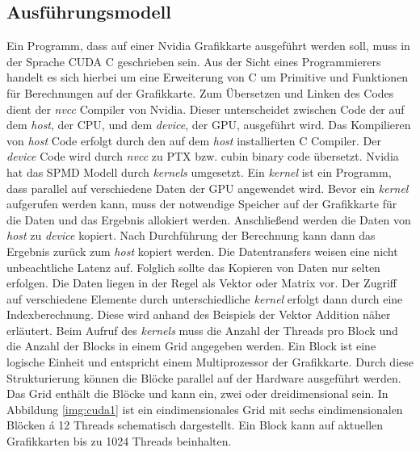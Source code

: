 \subsection{Ausführungsmodell}

Ein Programm, dass auf einer Nvidia Grafikkarte ausgeführt werden soll, muss in der Sprache CUDA C geschrieben sein. Aus der Sicht eines Programmierers handelt es sich hierbei um eine Erweiterung von C um Primitive und Funktionen für Berechnungen auf der Grafikkarte. Zum Übersetzen und Linken des Codes dient der \textit{nvcc} Compiler von Nvidia. Dieser unterscheidet zwischen Code der auf dem \textit{host}, der CPU, und dem \textit{device}, der GPU, ausgeführt wird. Das Kompilieren von \textit{host} Code erfolgt durch den auf dem \textit{host} installierten C Compiler. Der \textit{device} Code wird durch \textit{nvcc} zu PTX bzw. cubin binary code übersetzt.
Nvidia hat das SPMD Modell durch \textit{kernels} umgesetzt. Ein \textit{kernel} ist ein Programm, dass parallel auf verschiedene Daten der GPU angewendet wird. 
Bevor ein \textit{kernel} aufgerufen werden kann, muss der notwendige Speicher auf der Grafikkarte für die Daten und das Ergebnis allokiert werden. Anschließend werden die Daten von \textit{host} zu \textit{device} kopiert. Nach Durchführung der Berechnung kann dann das Ergebnis zurück zum \textit{host} kopiert werden. Die Datentransfers weisen eine nicht unbeachtliche Latenz auf. Folglich sollte das Kopieren von Daten nur selten erfolgen.
Die Daten liegen in der Regel als Vektor oder Matrix vor. Der Zugriff auf verschiedene Elemente durch unterschiedliche \textit{kernel} erfolgt dann durch eine Indexberechnung. Diese wird anhand des Beispiels der Vektor Addition näher erläutert.
Beim Aufruf des \textit{kernels} muss die Anzahl der Threads pro Block und die Anzahl der Blocks in einem Grid angegeben werden. Ein Block ist eine logische Einheit und entspricht einem Multiprozessor der Grafikkarte. Durch diese Strukturierung können die Blöcke parallel auf der Hardware ausgeführt werden. Das Grid enthält die Blöcke und kann ein, zwei oder dreidimensional sein. In Abbildung \ref{img:cuda1} ist ein eindimensionales Grid mit sechs eindimensionalen Blöcken á 12 Threads schematisch dargestellt. Ein Block kann auf aktuellen Grafikkarten bis zu 1024 Threads beinhalten.

